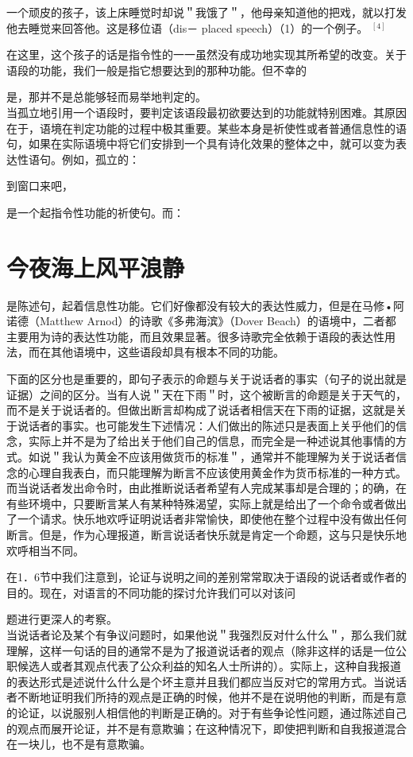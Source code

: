 \begin{displayquote}
一个顽皮的孩子，该上床睡觉时却说＂我饿了＂，他母亲知道他的把戏，就以打发他去睡觉来回答他。这是移位语（dis－ placed speech）（1）的一个例子。 ${ }^{[4]}$
\end{displayquote}

在这里，这个孩子的话是指令性的一一虽然没有成功地实现其所希望的改变。关于语段的功能，我们一般是指它想要达到的那种功能。但不幸的

是，那并不是总能够轻而易举地判定的。\\
当孤立地引用一个语段时，要判定该语段最初欲要达到的功能就特别困难。其原因在于，语境在判定功能的过程中极其重要。某些本身是祈使性或者普通信息性的语句，如果在实际语境中将它们安排到一个具有诗化效果的整体之中，就可以变为表达性语句。例如，孤立的：

到窗口来吧，

是一个起指令性功能的祈使句。而：

\section*{今夜海上风平浪静}
是陈述句，起着信息性功能。它们好像都没有较大的表达性威力，但是在马修•阿诺德（Matthew Arnod）的诗歌《多弗海滨》（Dover Beach）的语境中，二者都主要用为诗的表达性功能，而且效果显著。很多诗歌完全依赖于语段的表达性用法，而在其他语境中，这些语段却具有根本不同的功能。

下面的区分也是重要的，即句子表示的命题与关于说话者的事实（句子的说出就是证据）之间的区分。当有人说＂天在下雨＂时，这个被断言的命题是关于天气的，而不是关于说话者的。但做出断言却构成了说话者相信天在下雨的证据，这就是关于说话者的事实。也可能发生下述情况：人们做出的陈述只是表面上关乎他们的信念，实际上并不是为了给出关于他们自己的信息，而完全是一种述说其他事情的方式。如说＂我认为黄金不应该用做货币的标准＂，通常并不能理解为关于说话者信念的心理自我表白，而只能理解为断言不应该使用黄金作为货币标准的一种方式。而当说话者发出命令时，由此推断说话者希望有人完成某事却是合理的；的确，在有些环境中，只要断言某人有某种特殊渴望，实际上就是给出了一个命令或者做出了一个请求。快乐地欢呼证明说话者非常愉快，即使他在整个过程中没有做出任何断言。但是，作为心理报道，断言说话者快乐就是肯定一个命题，这与只是快乐地欢呼相当不同。

在1．6节中我们注意到，论证与说明之间的差别常常取决于语段的说话者或作者的目的。现在，对语言的不同功能的探讨允许我们可以对该问

题进行更深人的考察。\\
当说话者论及某个有争议问题时，如果他说＂我强烈反对什么什么＂，那么我们就理解，这样一句话的目的通常不是为了报道说话者的观点（除非这样的话是一位公职候选人或者其观点代表了公众利益的知名人士所讲的）。实际上，这种自我报道的表达形式是述说什么什么是个坏主意并且我们都应当反对它的常用方式。当说话者不断地证明我们所持的观点是正确的时候，他并不是在说明他的判断，而是有意的论证，以说服别人相信他的判断是正确的。对于有些争论性问题，通过陈述自己的观点而展开论证，并不是有意欺骗；在这种情况下，即使把判断和自我报道混合在一块儿，也不是有意欺骗。

